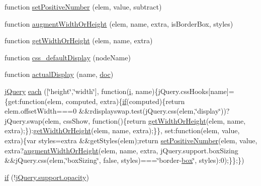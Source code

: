 \begin{DoxyCompactItemize}
\item 
function \hyperlink{_scripts_2jquery-1_810_82_8js_a049182834e8b4b2d7485cd919ed272d7}{set\+Positive\+Number} (elem, value, subtract)
\item 
function \hyperlink{_scripts_2jquery-1_810_82_8js_aacaac1f0b5ea53030522e6f5b227ce51}{augment\+Width\+Or\+Height} (elem, name, extra, is\+Border\+Box, styles)
\item 
function \hyperlink{_scripts_2jquery-1_810_82_8js_a6520fbbeac78eeb0f519393470dc873b}{get\+Width\+Or\+Height} (elem, name, extra)
\item 
function \hyperlink{_scripts_2jquery-1_810_82_8js_a90f91be23732240774f2a323d500c78a}{css\+\_\+default\+Display} (node\+Name)
\item 
function \hyperlink{_scripts_2jquery-1_810_82_8js_a88bc5a80e40ccc594ece17ae5772d5d3}{actual\+Display} (name, \hyperlink{_scripts_2respond_8js_a8375eceb3a4b59a36700e7fc468e8983}{doc})
\item 
\hyperlink{_scripts_2jquery-1_810_82_8js_a5e01048fbd3a30b44e8d491d8945c457}{j\+Query} \hyperlink{_scripts_2jquery-1_810_82_8js_a7b098aabef28793353f2babd804e0b79}{each} (\mbox{[}\char`\"{}height\char`\"{},\char`\"{}width\char`\"{}\mbox{]}, function(\hyperlink{jquery_8unobtrusive-ajax_8min_8js_a84da5ff1aa6008a770fb28040f6b0569}{i}, name)\{j\+Query.\+css\+Hooks\mbox{[}name\mbox{]}=\{get\+:function(elem, computed, extra)\{\hyperlink{_scripts_2respond_8min_8js_a93851d60dd037a83509a1757b9ee7b66}{if}(computed)\{return elem.\+offset\+Width===0 \&\&rdisplayswap.\+test(j\+Query.\+css(elem,\char`\"{}display\char`\"{}))?j\+Query.\+swap(elem, css\+Show, function()\{return \hyperlink{_scripts_2jquery-1_810_82_8js_a6520fbbeac78eeb0f519393470dc873b}{get\+Width\+Or\+Height}(elem, name, extra);\})\+:\hyperlink{_scripts_2jquery-1_810_82_8js_a6520fbbeac78eeb0f519393470dc873b}{get\+Width\+Or\+Height}(elem, name, extra);\}\}, set\+:function(elem, value, extra)\{var styles=extra \&\&get\+Styles(elem);return \hyperlink{_scripts_2jquery-1_810_82_8js_a049182834e8b4b2d7485cd919ed272d7}{set\+Positive\+Number}(elem, value, extra?\hyperlink{_scripts_2jquery-1_810_82_8js_aacaac1f0b5ea53030522e6f5b227ce51}{augment\+Width\+Or\+Height}(elem, name, extra, j\+Query.\+support.\+box\+Sizing \&\&j\+Query.\+css(elem,\char`\"{}box\+Sizing\char`\"{}, false, styles)===\char`\"{}border-\/\hyperlink{login_8js_aa8f7ceeeb7d6500a03397f4cf05d3969}{box}\char`\"{}, styles)\+:0);\}\};\})
\item 
\hyperlink{_scripts_2jquery-1_810_82_8js_abc7375d3165b805c35ce8ca2e1a31e81}{if} (!\hyperlink{_scripts_2jquery-1_810_82_8min_8js_a328c19d9255bfd09a2f3cddecadca6ad}{j\+Query.\+support.\+opacity})

\end{DoxyCompactItemize}
